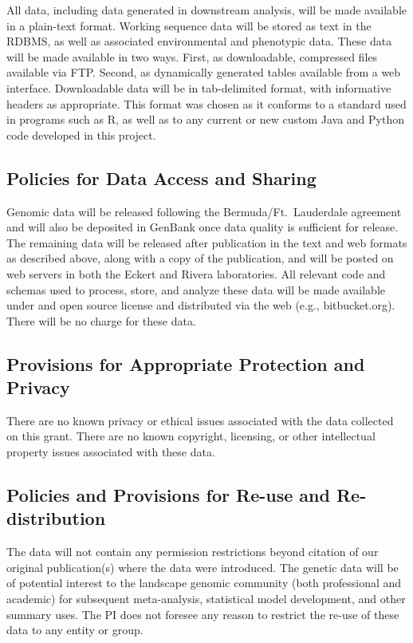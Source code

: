 All data, including data generated in downstream analysis, will be made available in a plain-text format.  Working sequence
data will be stored as text in the RDBMS, as well as associated environmental and phenotypic data.  These data will be 
made available in two ways.  First, as downloadable, compressed files available via FTP.  Second, as dynamically generated
tables available from a web interface.  Downloadable data will be in tab-delimited format, with informative headers 
as appropriate.  This format was chosen as it conforms to a standard used in programs such as R, as well as to any 
current or new custom Java and Python code developed in this project.

\subsection*{Policies for Data Access and Sharing}
Genomic data will be released following the Bermuda/Ft.\ Lauderdale agreement and will also be deposited in 
GenBank once data quality is sufficient for release. The remaining data will be released after publication in the 
text and web formats as described above, along with a copy of the publication, and will be posted on web servers in both
the Eckert and Rivera laboratories. All relevant code and schemas used to process, store, and analyze these data will 
be made available under and open source license and distributed via the web (e.g., bitbucket.org).  There will be no 
charge for these data. 

\subsection*{Provisions for Appropriate Protection and Privacy}
There are no known privacy or ethical issues associated with the data collected on this grant. 
There are no known copyright, licensing, or other intellectual property issues associated with these data.

\subsection*{Policies and Provisions for Re-use and Re-distribution}
The data will not contain any permission restrictions beyond citation of our original publication(s) where the data 
were introduced. The genetic data will be of potential interest to the landscape genomic community (both 
professional and academic) for subsequent meta-analysis, statistical model development, and other summary 
uses. The PI does not foresee any reason to restrict the re-use of these data to any entity or group.

